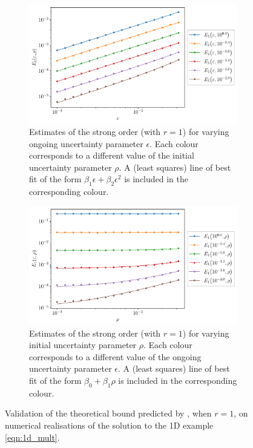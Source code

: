 \begin{figure}
	\begin{center}
		\begin{subfigure}{\textwidth}
			\includegraphics[width=\textwidth]{chp04_paper_numerics/figures/multiplicative/str_err_eps_r_1.0_log.pdf}
			\caption{Estimates of the strong order (with \(r = 1\)) for varying ongoing uncertainty parameter \(\epsilon\).
				Each colour corresponds to a different value of the initial uncertainty parameter \(\rho\).
				A (least squares) line of best fit of the form \(\beta_1 \epsilon + \beta_2 \epsilon^2\) is included in the corresponding colour.}
			\label{fig:multiplicative_eps_lines}
		\end{subfigure}
		\begin{subfigure}{\textwidth}
			\includegraphics[width=\textwidth]{chp04_paper_numerics/figures/multiplicative/str_err_rho_r_1.0_log.pdf}
			\caption{Estimates of the strong order (with \(r = 1\)) for varying initial uncertainty parameter \(\rho\).
				Each colour corresponds to a different value of the ongoing uncertainty parameter \(\epsilon\).
				A (least squares) line of best fit of the form \(\beta_0 + \beta_1 \rho\) is included in the corresponding colour.}
			\label{fig:multiplicative_delta_lines}
		\end{subfigure}
		\caption{Validation of the theoretical bound predicted by , when \(r = 1\), on numerical realisations of the solution to the 1D example \cref{eqn:1d_mult}.}
		\label{fig:multiplicative_delta_eps_lines}
	\end{center}
\end{figure}

